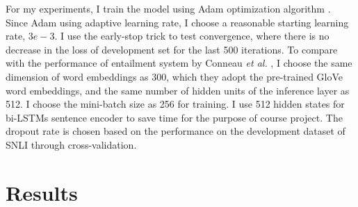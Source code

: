 \documentclass{article}
\newcommand{\etal}{\emph{et al. }}
\begin{document}
For my experiments, I train the model using Adam optimization algorithm \cite{kingma2014adam}. Since Adam using adaptive learning rate, I choose a reasonable starting learning rate, $3e-3$. I use the early-stop trick to test convergence, where there is no decrease in the loss of development set for the last 500 iterations. To compare with the performance of entailment system by Conneau \etal \cite{conneau2017supervised}, I choose the same dimension of word embeddings as 300, which they adopt the pre-trained GloVe word embeddings, and the same number of hidden units of the inference layer as 512. I choose the mini-batch size as 256 for training. I use 512 hidden states for bi-LSTMs sentence encoder to save time for the purpose of course project. The dropout rate is chosen based on the performance on the development dataset of SNLI through cross-validation.

\section{Results}
\end{document}
